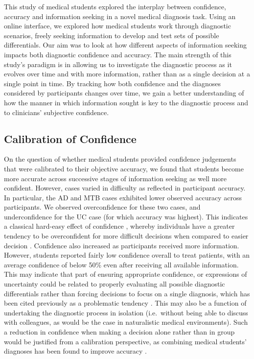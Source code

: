 \documentclass[a4paper, nobind]{templates/ociamthesis}
\begin{document}
This study of medical students explored the interplay between confidence, accuracy and information seeking in a novel medical diagnosis task. Using an online interface, we explored how medical students work through diagnostic scenarios, freely seeking information to develop and test sets of possible differentials. Our aim was to look at how different aspects of information seeking impacts both diagnostic confidence and accuracy. The main strength of this study's paradigm is in allowing us to investigate the diagnostic process as it evolves over time and with more information, rather than as a single decision at a single point in time. By tracking how both confidence and the diagnoses considered by participants changes over time, we gain a better understanding of how the manner in which information sought is key to the diagnostic process and to clinicians' subjective confidence.

\subsection*{Calibration of Confidence}\label{calibration-of-confidence}

On the question of whether medical students provided confidence judgements that were calibrated to their objective accuracy, we found that students become more accurate across successive stages of information seeking as well more confident. However, cases varied in difficulty as reflected in participant accuracy. In particular, the AD and MTB cases exhibited lower observed accuracy across participants. We observed overconfidence for these two cases, and underconfidence for the UC case (for which accuracy was highest). This indicates a classical hard-easy effect of confidence \autocite{lichtenstein_calibration_1977}, whereby individuals have a greater tendency to be overconfident for more difficult decisions when compared to easier decision \autocite{merkle_disutility_2009}. Confidence also increased as participants received more information. However, students reported fairly low confidence overall to treat patients, with an average confidence of below 50\% even after receiving all available information. This may indicate that part of ensuring appropriate confidence, or expressions of uncertainty could be related to properly evaluating all possible diagnostic differentials rather than forcing decisions to focus on a single diagnosis, which has been cited previously as a problematic tendency \autocite{redelmeier_fallacy_2023}. This may also be a function of undertaking the diagnostic process in isolation (i.e.~without being able to discuss with colleagues, as would be the case in naturalistic medical environments). Such a reduction in confidence when making a decision alone rather than in group would be justified from a calibration perspective, as combining medical students' diagnoses has been found to improve accuracy \autocite{kammer_potential_2017}.\\
\end{document}
